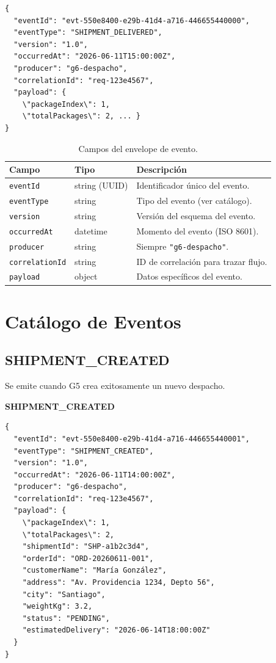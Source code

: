 \documentclass[11pt, a4paper]{article}
\newcommand{\contractheader}[1]{%
  \noindent\colorbox{primary!10}{%
    \parbox{\dimexpr\textwidth-2\fboxsep}{%
      \textbf{\faFileCode\quad #1}%
    }%
  }
  \vspace{0.3cm}
}
\begin{document}
\begin{lstlisting}
{
  "eventId": "evt-550e8400-e29b-41d4-a716-446655440000",
  "eventType": "SHIPMENT_DELIVERED",
  "version": "1.0",
  "occurredAt": "2026-06-11T15:00:00Z",
  "producer": "g6-despacho",
  "correlationId": "req-123e4567",
  "payload": {
    \"packageIndex\": 1,
    \"totalPackages\": 2, ... }
}
\end{lstlisting}

\begin{table}[ht!]
\centering
\renewcommand{\arraystretch}{1.4}
\begin{tabularx}{\textwidth}{l l X}
  \toprule
  \textbf{Campo} & \textbf{Tipo} & \textbf{Descripción} \\
  \midrule
  \texttt{eventId}       & string (UUID) & Identificador único del evento. \\
  \texttt{eventType}     & string        & Tipo del evento (ver catálogo). \\
  \texttt{version}       & string        & Versión del esquema del evento. \\
  \texttt{occurredAt}    & datetime      & Momento del evento (ISO 8601). \\
  \texttt{producer}      & string        & Siempre \texttt{"g6-despacho"}. \\
  \texttt{correlationId} & string        & ID de correlación para trazar flujo. \\
  \texttt{payload}       & object        & Datos específicos del evento. \\
  \bottomrule
\end{tabularx}
\caption{Campos del envelope de evento.}
\end{table}


\section{Catálogo de Eventos}

\subsection{SHIPMENT\_CREATED}

Se emite cuando G5 crea exitosamente un nuevo despacho.

\contractheader{SHIPMENT\_CREATED}

\begin{lstlisting}
{
  "eventId": "evt-550e8400-e29b-41d4-a716-446655440001",
  "eventType": "SHIPMENT_CREATED",
  "version": "1.0",
  "occurredAt": "2026-06-11T14:00:00Z",
  "producer": "g6-despacho",
  "correlationId": "req-123e4567",
  "payload": {
    \"packageIndex\": 1,
    \"totalPackages\": 2,
    "shipmentId": "SHP-a1b2c3d4",
    "orderId": "ORD-20260611-001",
    "customerName": "María González",
    "address": "Av. Providencia 1234, Depto 56",
    "city": "Santiago",
    "weightKg": 3.2,
    "status": "PENDING",
    "estimatedDelivery": "2026-06-14T18:00:00Z"
  }
}
\end{lstlisting}
\end{document}
